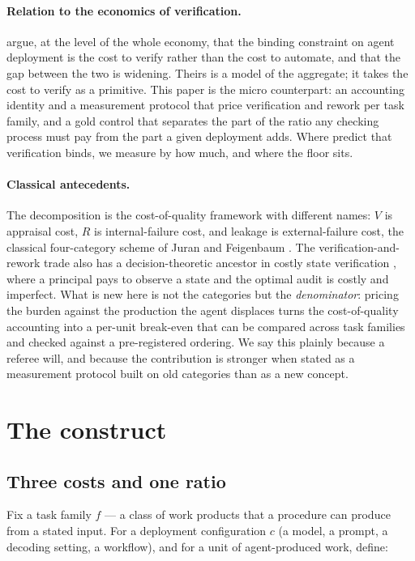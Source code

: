\documentclass[11pt]{article}
\newcommand{\VV}{\ensuremath{V}}
\newcommand{\RV}{\ensuremath{R}}
\begin{document}
\paragraph{Relation to the economics of verification.}
\citet{catalini2026} argue, at the level of the whole economy, that the binding constraint on
agent deployment is the cost to verify rather than the cost to automate, and that the gap
between the two is widening. Theirs is a model of the aggregate; it takes the cost to verify as
a primitive. This paper is the micro counterpart: an accounting identity and a measurement
protocol that price verification and rework per task family, and a gold control that separates
the part of the ratio any checking process must pay from the part a given deployment adds.
Where \citet{catalini2026} predict that verification binds, we measure by how much, and where
the floor sits.

\paragraph{Classical antecedents.}
The decomposition is the cost-of-quality framework with different names: $\VV$ is appraisal cost,
$\RV$ is internal-failure cost, and leakage is external-failure cost, the classical four-category
scheme of Juran and Feigenbaum \citep{juran1999,feigenbaum1961}. The verification-and-rework trade
also has a decision-theoretic ancestor in costly state verification \citep{townsend1979}, where a
principal pays to observe a state and the optimal audit is costly and imperfect. What is new here is
not the categories but the \emph{denominator}: pricing the burden against the production the agent
displaces turns the cost-of-quality accounting into a per-unit break-even that can be compared
across task families and checked against a pre-registered ordering. We say this plainly because a
referee will, and because the contribution is stronger when stated as a measurement protocol built
on old categories than as a new concept.

\section{The construct}
\label{sec:construct}

\subsection{Three costs and one ratio}

Fix a task family $f$ --- a class of work products that a procedure can produce from a stated
input. For a deployment configuration $c$ (a model, a prompt, a decoding setting, a workflow), and
for a unit of agent-produced work, define:
\end{document}
